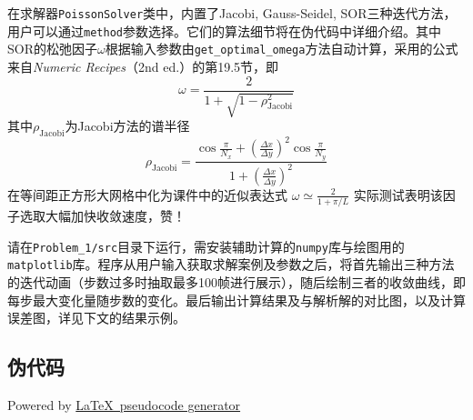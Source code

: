 在求解器\texttt{PoissonSolver}类中，内置了Jacobi, Gauss-Seidel, SOR三种迭代方法，用户可以通过\texttt{method}参数选择。它们的算法细节将在伪代码中详细介绍。其中SOR的松弛因子$\omega$根据输入参数由\texttt{get\_optimal\_omega}方法自动计算，采用的公式来自\textit{Numeric Recipes}（2nd ed.）的第19.5节，即
\[\omega=\frac2{1+\sqrt{1-\rho_{\mathrm{Jacobi}}^2}}\]
其中$\rho_{\mathrm{Jacobi}}$为Jacobi方法的谱半径
\[\rho_\text{Jacobi}=\frac{\cos\frac\pi {N_x}+\left(\frac{\Delta x}{\Delta y}\right)^2\cos\frac\pi {N_y}}{1+\left(\frac{\Delta x}{\Delta y}\right)^2}\]
在等间距正方形大网格中化为课件中的近似表达式
\(\omega \simeq \frac{2}{1+\pi / L}\)
实际测试表明该因子选取大幅加快收敛速度，赞！

请在\texttt{Problem\_1/src}目录下运行，需安装辅助计算的\texttt{numpy}库与绘图用的\texttt{matplotlib}库。程序从用户输入获取求解案例及参数之后，将首先输出三种方法的迭代动画（步数过多时抽取最多100帧进行展示），随后绘制三者的收敛曲线，即每步最大变化量随步数的变化。最后输出计算结果及与解析解的对比图，以及计算误差图，详见下文的结果示例。
\subsection{伪代码}
Powered by \href{https://chatgpt.com/g/g-xJJAA2awf-latex-pseudocode-generator}{\LaTeX \ pseudocode generator}


